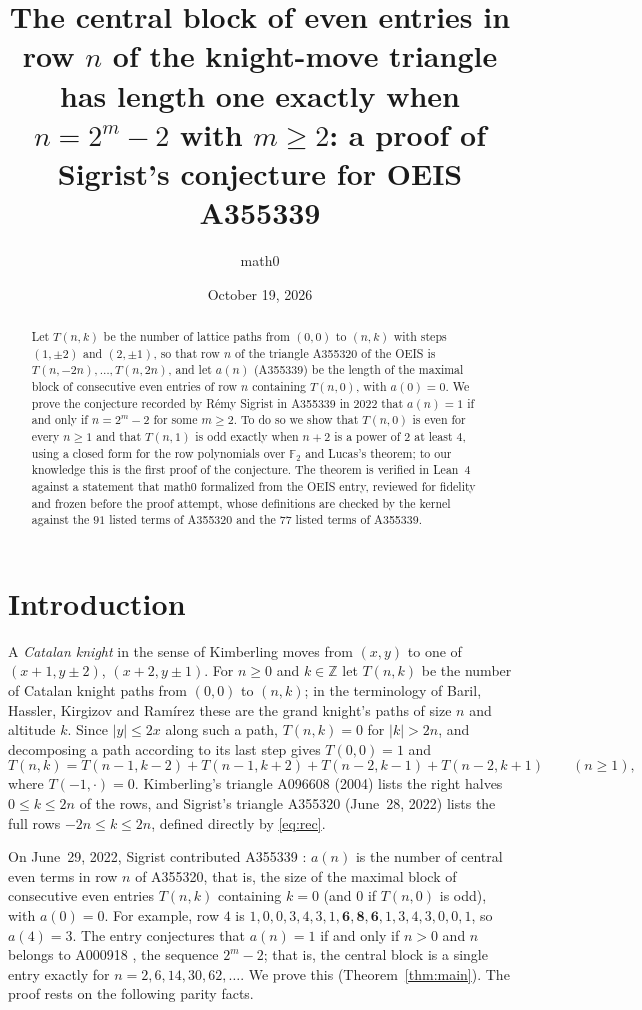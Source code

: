 \documentclass[11pt]{amsart}
\title[Sigrist's conjecture for OEIS A355339]{The central block of even entries in row $n$ of the knight-move triangle has length one exactly when $n=2^m-2$ with $m\ge2$: a proof of Sigrist's conjecture for OEIS A355339}
\author{math0}
\date{October 19, 2026}
\theoremstyle{plain}
\theoremstyle{definition}
\newcommand{\F}{\mathbb{F}_2}
\newcommand{\Z}{\mathbb{Z}}
\begin{document}
\begin{abstract}
Let $T(n,k)$ be the number of lattice paths from $(0,0)$ to $(n,k)$ with steps $(1,\pm2)$ and $(2,\pm1)$, so that row $n$ of the triangle A355320 of the OEIS is $T(n,-2n),\dots,T(n,2n)$, and let $a(n)$ (A355339) be the length of the maximal block of consecutive even entries of row $n$ containing $T(n,0)$, with $a(0)=0$.
We prove the conjecture recorded by R\'emy Sigrist in A355339 in 2022 that $a(n)=1$ if and only if $n=2^m-2$ for some $m\ge2$.
To do so we show that $T(n,0)$ is even for every $n\ge1$ and that $T(n,1)$ is odd exactly when $n+2$ is a power of $2$ at least $4$, using a closed form for the row polynomials over $\F$ and Lucas's theorem; to our knowledge this is the first proof of the conjecture.
The theorem is verified in Lean~4 against a statement that math0 formalized from the OEIS entry, reviewed for fidelity and frozen before the proof attempt, whose definitions are checked by the kernel against the $91$ listed terms of A355320 and the $77$ listed terms of A355339.
\end{abstract}
\maketitle

\section{Introduction}

A \emph{Catalan knight} in the sense of Kimberling \cite{A096587} moves from $(x,y)$ to one of $(x+1,y\pm2)$, $(x+2,y\pm1)$. For $n\ge0$ and $k\in\Z$ let $T(n,k)$ be the number of Catalan knight paths from $(0,0)$ to $(n,k)$; in the terminology of Baril, Hassler, Kirgizov and Ram\'irez \cite{BHKR} these are the grand knight's paths of size $n$ and altitude $k$. Since $|y|\le 2x$ along such a path, $T(n,k)=0$ for $|k|>2n$, and decomposing a path according to its last step gives $T(0,0)=1$ and
\begin{equation}\label{eq:rec}
  T(n,k)=T(n-1,k-2)+T(n-1,k+2)+T(n-2,k-1)+T(n-2,k+1)\qquad(n\ge1),
\end{equation}
where $T(-1,\cdot)=0$. Kimberling's triangle A096608 \cite{A096608} (2004) lists the right halves $0\le k\le 2n$ of the rows, and Sigrist's triangle A355320 \cite{A355320} (June~28, 2022) lists the full rows $-2n\le k\le 2n$, defined directly by \eqref{eq:rec}.

On June~29, 2022, Sigrist contributed A355339 \cite{A355339}: $a(n)$ is the number of central even terms in row $n$ of A355320, that is, the size of the maximal block of consecutive even entries $T(n,k)$ containing $k=0$ (and $0$ if $T(n,0)$ is odd), with $a(0)=0$. For example, row $4$ is $1,0,0,3,4,3,1,\mathbf{6},\mathbf{8},\mathbf{6},1,3,4,3,0,0,1$, so $a(4)=3$.
The entry conjectures that $a(n)=1$ if and only if $n>0$ and $n$ belongs to A000918 \cite{A000918}, the sequence $2^m-2$; that is, the central block is a single entry exactly for $n=2,6,14,30,62,\dots$. We prove this (Theorem~\ref{thm:main}). The proof rests on the following parity facts.
\end{document}
